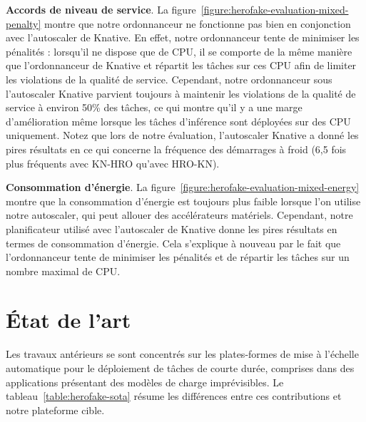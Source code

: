 \textbf{Accords de niveau de service}. La figure~\ref{figure:herofake-evaluation-mixed-penalty} montre que notre ordonnanceur ne fonctionne pas bien en conjonction avec l'autoscaler de Knative. En effet, notre ordonnanceur tente de minimiser les pénalités : lorsqu'il ne dispose que de CPU, il se comporte de la même manière que l'ordonnanceur de Knative et répartit les tâches sur ces CPU afin de limiter les violations de la qualité de service. Cependant, notre ordonnanceur sous l'autoscaler Knative parvient toujours à maintenir les violations de la qualité de service à environ 50\% des tâches, ce qui montre qu'il y a une marge d'amélioration même lorsque les tâches d'inférence sont déployées sur des CPU uniquement. Notez que lors de notre évaluation, l'autoscaler Knative a donné les pires résultats en ce qui concerne la fréquence des démarrages à froid (6,5 fois plus fréquents avec KN-HRO qu'avec HRO-KN).

\textbf{Consommation d'énergie}. La figure~\ref{figure:herofake-evaluation-mixed-energy} montre que la consommation d'énergie est toujours plus faible lorsque l'on utilise notre autoscaler, qui peut allouer des accélérateurs matériels. Cependant, notre planificateur utilisé avec l'autoscaler de Knative donne les pires résultats en termes de consommation d'énergie. Cela s'explique à nouveau par le fait que l'ordonnanceur tente de minimiser les pénalités et de répartir les tâches sur un nombre maximal de CPU.

\section{État de l'art}
\label{section:herofake-sota}

Les travaux antérieurs se sont concentrés sur les plates-formes de mise à l'échelle automatique pour le déploiement de tâches de courte durée, comprises dans des applications présentant des modèles de charge imprévisibles. Le tableau~\ref{table:herofake-sota} résume les différences entre ces contributions et notre plateforme cible.

